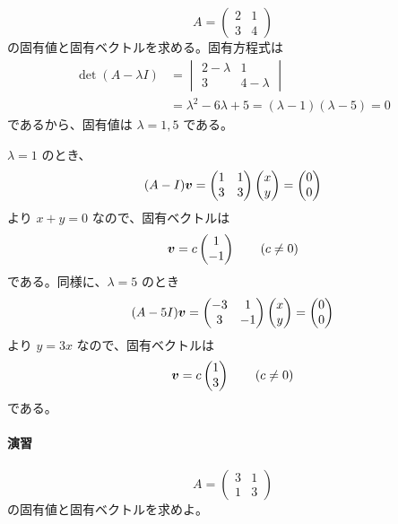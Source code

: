 \begin{example}[固有値と固有ベクトル]
\[
 A=\begin{pmatrix}2&1\\3&4\end{pmatrix}
\]
の固有値と固有ベクトルを求める。固有方程式は
\begin{align*}
 \det(A-\lambda I)
 &=\begin{vmatrix}2-\lambda&1\\3&4-\lambda\end{vmatrix}\\
 &=\lambda^2-6\lambda+5
  =(\lambda-1)(\lambda-5)=0
\end{align*}
であるから、固有値は $\lambda=1,5$ である。

$\lambda=1$ のとき、
\[
 (A-I)\bm{v}
 =\begin{pmatrix}1&1\\3&3\end{pmatrix}
  \begin{pmatrix}x\\y\end{pmatrix}
 =\begin{pmatrix}0\\0\end{pmatrix}
\]
より $x+y=0$ なので、固有ベクトルは
\[
 \bm{v}=c\begin{pmatrix}1\\-1\end{pmatrix}\qquad(c\ne0)
\]
である。同様に、$\lambda=5$ のとき
\[
 (A-5I)\bm{v}
 =\begin{pmatrix}-3&1\\3&-1\end{pmatrix}
  \begin{pmatrix}x\\y\end{pmatrix}
 =\begin{pmatrix}0\\0\end{pmatrix}
\]
より $y=3x$ なので、固有ベクトルは
\[
 \bm{v}=c\begin{pmatrix}1\\3\end{pmatrix}\qquad(c\ne0)
\]
である。
\end{example}

\paragraph{演習}
\[
 A=\begin{pmatrix}3&1\\1&3\end{pmatrix}
\]
の固有値と固有ベクトルを求めよ。


